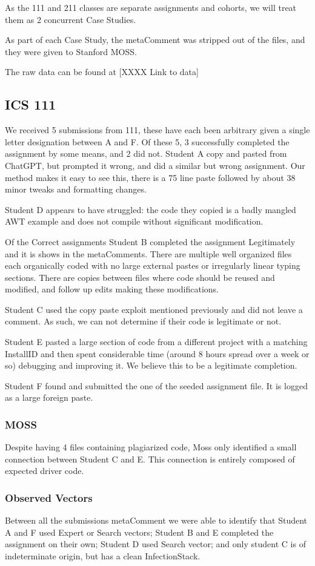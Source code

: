 \documentclass[letterpaper,10pt,conference]{IEEEtran}
\newcommand{\installID}{InstallID\xspace}
\newcommand{\metaComment}{metaComment\xspace}
\newcommand{\infectionStack}{InfectionStack\xspace}
\begin{document}
As the 111 and 211 classes are separate assignments and cohorts, we will treat them as 2 concurrent Case Studies. 

As part of each Case Study, the \metaComment was stripped out of the files, and they were given to Stanford MOSS.

The raw data can be found at [XXXX Link to data]
\subsection{ICS 111}
We received 5 submissions from 111, these have each been arbitrary given a single letter designation between A and F.  Of these 5, 3 successfully completed the assignment by some means, and 2 did not.  Student A copy and pasted from ChatGPT, but prompted it wrong, and did a similar but wrong assignment.  Our method makes it easy to see this, there is a 75 line paste followed by about 38 minor tweaks and formatting changes.

Student D appears to have struggled: the code they copied is a badly mangled AWT example and does not compile without significant modification.

Of the Correct assignments Student B completed the assignment Legitimately and it is shows in the \metaComment{}s.  There are multiple well organized files each organically coded with no large external pastes or irregularly linear typing sections.  There are copies between files where code should be reused and modified, and follow up edits making these modifications.

Student C used the copy paste exploit mentioned previously and did not leave a comment.  As such, we can not determine if their code is legitimate or not.

Student E pasted a large section of code from a different project with a matching \installID and then spent considerable time (around 8 hours spread over a week or so) debugging and improving it.  We believe this to be a legitimate completion.

Student F found and submitted the one of the seeded assignment file.  It is logged as a large foreign paste.

\subsubsection{MOSS}
Despite having 4 files containing plagiarized code, Moss only identified a small connection between Student C and E.  This connection is entirely composed of expected driver code. 
\subsubsection{Observed Vectors}
Between all the submissions \metaComment we were able to identify that Student A and F used Expert or Search vectors; Student B and E completed the assignment on their own; Student D used Search vector; and only student C is of indeterminate origin, but has a clean \infectionStack.
\end{document}
